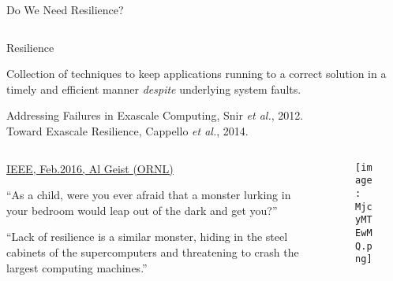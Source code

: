 \begin{frame}{Do We Need Resilience?}

\begin{columns}
\begin{column}{1.05\textwidth}

\begin{block}{Resilience}
\begin{center}
Collection of techniques to keep applications 
running to a correct solution in a timely and 
efficient manner {\it despite} underlying system faults.
\end{center}
\end{block}
{ \footnotesize Addressing Failures in Exascale Computing, 
Snir {\it et al.}, 2012.\\
Toward Exascale Resilience, Cappello {\it et al.}, 2014.}
\end{column}
\end{columns}
%
\vspace{-0.35cm}
%
\begin{columns}
\hspace{-1cm}
\begin{column}{0.65\textwidth}
\bi
\item[] \underline{IEEE, Feb.2016, Al Geist (ORNL)}
\item[] ``As a child, were you ever afraid that a monster 
lurking in your bedroom would leap out of the dark and get you?''
\mmk
\item[] ``Lack of resilience is a similar monster, hiding 
in the steel cabinets of the supercomputers and threatening 
to crash the largest computing machines.''
\ei
\end{column}
\begin{column}{0.4\textwidth}
\begin{figure}
\texttt{[image: MjcyMTEwMQ.png]}
\end{figure}
\end{column}
\end{columns}
%
\end{frame}





